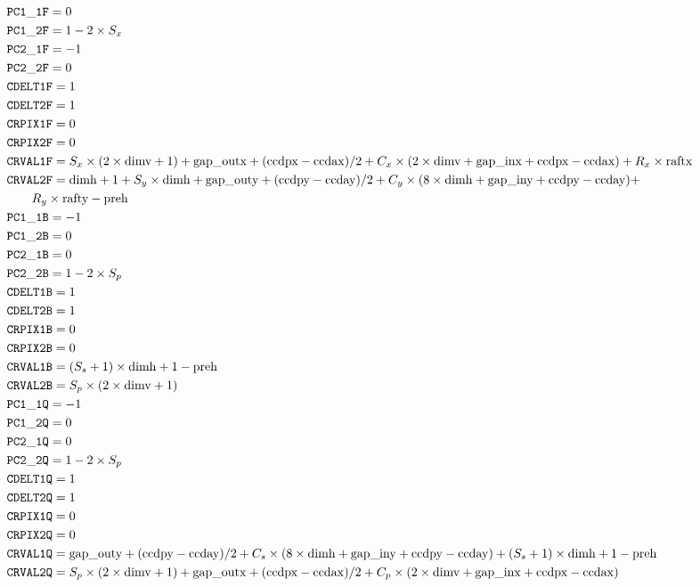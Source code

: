 \documentclass{article}[12pt]
\begin{document}
\begin{align*}
& {\tt PC1\_1F} = 0 \\
& {\tt PC1\_2F} = 1 - 2 \times S_x \\
& {\tt PC2\_1F} = -1 \\
& {\tt PC2\_2F} = 0 \\
& {\tt CDELT1F} = 1 \\
& {\tt CDELT2F} = 1 \\
& {\tt CRPIX1F} = 0 \\
& {\tt CRPIX2F} = 0 \\
& {\tt CRVAL1F} = S_x \times(2 \times {\rm dimv} + 1) + {\rm gap\_outx} + ({\rm ccdpx} - {\rm ccdax})/2 + C_x \times (2 \times {\rm dimv} + {\rm gap\_inx} + {\rm ccdpx} - {\rm ccdax}) + R_x \times {\rm raftx} \\
& {\tt CRVAL2F} = {\rm dimh} + 1 + S_y \times {\rm dimh} + {\rm gap\_outy} + ({\rm ccdpy} - {\rm ccday})/2 +  C_y \times ( 8 \times {\rm dimh} + {\rm gap\_iny} + {\rm ccdpy} - {\rm ccday}) + \\  &\qquad {} R_y \times {\rm rafty} - {\rm preh} \\
& {\tt PC1\_1B} = -1   \\
& {\tt PC1\_2B} = 0 \\
& {\tt PC2\_1B} = 0 \\
& {\tt PC2\_2B} = 1 - 2 \times S_p \\
& {\tt CDELT1B} = 1 \\
& {\tt CDELT2B} = 1 \\
& {\tt CRPIX1B} = 0 \\
& {\tt CRPIX2B} = 0 \\
& {\tt CRVAL1B} = (S_s + 1) \times {\rm dimh} + 1 - {\rm preh} \\
& {\tt CRVAL2B} = S_p \times (2 \times {\rm dimv} + 1)  \\
& {\tt PC1\_1Q} = -1   \\
& {\tt PC1\_2Q} = 0 \\
& {\tt PC2\_1Q} = 0 \\
& {\tt PC2\_2Q} = 1 - 2 \times S_p  \\
& {\tt CDELT1Q} = 1 \\
& {\tt CDELT2Q} = 1 \\
& {\tt CRPIX1Q} = 0 \\
& {\tt CRPIX2Q} = 0 \\
& {\tt CRVAL1Q} = {\rm gap\_outy} + ({\rm ccdpy} - {\rm ccday})/2 + C_s \times (8 \times {\rm dimh} + {\rm gap\_iny} + {\rm ccdpy} - {\rm ccday}) + (S_s + 1) \times {\rm dimh} + 1  - {\rm preh} \\
& {\tt CRVAL2Q} = S_p \times (2 \times {\rm dimv} + 1) +  {\rm gap\_outx} + ({\rm ccdpx} - {\rm ccdax})/2 + C_p \times ( 2 \times {\rm dimv} + {\rm gap\_inx} + {\rm ccdpx} - {\rm ccdax}) \\
\end{align*}
\end{document}
